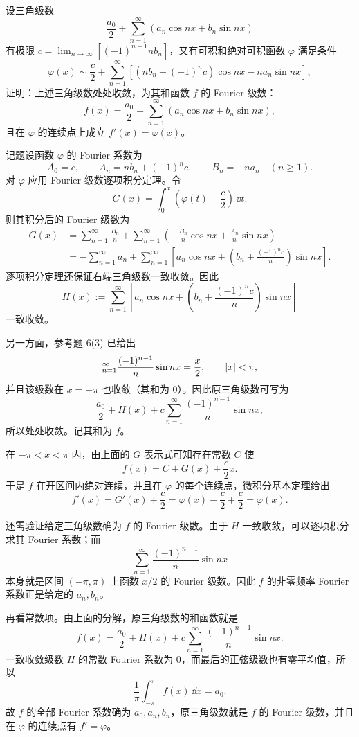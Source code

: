 \begin{xreferenceproblem}[16]
设三角级数
  \[
    \frac{a_0}{2}+\sum_{n=1}^{\infty}(a_n\cos nx+b_n\sin nx)
  \]
  有极限 $c=\lim_{n\to\infty}[(-1)^{n-1}nb_n]$，又有可积和绝对可积函数 $\varphi$ 满足条件
  \[
    \varphi(x)\sim\frac c2+\sum_{n=1}^{\infty}[(nb_n+(-1)^nc)\cos nx-na_n\sin nx],
  \]
  证明：上述三角级数处处收敛，为其和函数 $f$ 的 Fourier 级数：
  \[
    f(x)=\frac{a_0}{2}+\sum_{n=1}^{\infty}(a_n\cos nx+b_n\sin nx),
  \]
  且在 $\varphi$ 的连续点上成立 $f'(x)=\varphi(x)$。
\end{xreferenceproblem}
\begin{xsolution}
记题设函数 $\varphi$ 的 Fourier 系数为
\[
  A_0=c,\qquad
  A_n=nb_n+(-1)^nc,\qquad
  B_n=-na_n\quad(n\ge1).
\]
对 $\varphi$ 应用 Fourier 级数逐项积分定理。令
\[
  G(x)=\int_0^x\left(\varphi(t)-\frac c2\right)\,\dd t.
\]
则其积分后的 Fourier 级数为
\begin{align*}
  G(x)
  &=\sum_{n=1}^{\infty}\frac{B_n}{n}
   +\sum_{n=1}^{\infty}
   \left(-\frac{B_n}{n}\cos nx+\frac{A_n}{n}\sin nx\right)\\
  &=-\sum_{n=1}^{\infty}a_n
   +\sum_{n=1}^{\infty}
   \left[a_n\cos nx+\left(b_n+\frac{(-1)^nc}{n}\right)\sin nx\right].
\end{align*}
逐项积分定理还保证右端三角级数一致收敛。因此
\[
  H(x):=\sum_{n=1}^{\infty}
  \left[a_n\cos nx+\left(b_n+\frac{(-1)^nc}{n}\right)\sin nx\right]
\]
一致收敛。

另一方面，参考题 6(3) 已给出
\[
  \relax_{n=1}^{\infty}\frac{(-1)^{n-1}}n\sin nx
  =\frac x2,
  \qquad\lvert x\rvert<\pi,
\]
并且该级数在 $x=\pm\pi$ 也收敛（其和为 $0$）。因此原三角级数可写为
\[
  \frac{a_0}{2}+H(x)
  +c\sum_{n=1}^{\infty}\frac{(-1)^{n-1}}n\sin nx,
\]
所以处处收敛。记其和为 $f$。

在 $-\pi<x<\pi$ 内，由上面的 $G$ 表示式可知存在常数 $C$ 使
\[
  f(x)=C+G(x)+\frac c2x.
\]
于是 $f$ 在开区间内绝对连续，并且在 $\varphi$ 的每个连续点，微积分基本定理给出
\[
  f'(x)=G'(x)+\frac c2
  =\varphi(x)-\frac c2+\frac c2
  =\varphi(x).
\]

还需验证给定三角级数确为 $f$ 的 Fourier 级数。由于 $H$ 一致收敛，可以逐项积分求其 Fourier 系数；而
\[
  \sum_{n=1}^{\infty}\frac{(-1)^{n-1}}n\sin nx
\]
本身就是区间 $(-\pi,\pi)$ 上函数 $x/2$ 的 Fourier 级数。因此 $f$ 的非零频率 Fourier 系数正是给定的 $a_n,b_n$。

再看常数项。由上面的分解，原三角级数的和函数就是
\[
  f(x)=\frac{a_0}{2}+H(x)
  +c\sum_{n=1}^{\infty}\frac{(-1)^{n-1}}n\sin nx.
\]
一致收敛级数 $H$ 的常数 Fourier 系数为 $0$，而最后的正弦级数也有零平均值，所以
\[
  \frac1\pi\int_{-\pi}^{\pi}f(x)\,\dd x=a_0.
\]
故 $f$ 的全部 Fourier 系数确为 $a_0,a_n,b_n$，原三角级数就是 $f$ 的 Fourier 级数，并且在 $\varphi$ 的连续点有 $f'=\varphi$。
\end{xsolution}


